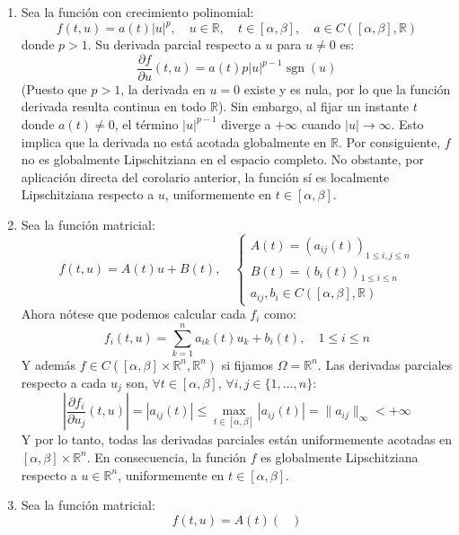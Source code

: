 {\begin{enumerate}
        \item Sea la función con crecimiento polinomial:
        \[
            f(t,u) = a(t) |u|^p, \quad u \in \mathbb{R}, \quad t \in [\alpha, \beta], \quad a \in C([\alpha, \beta], \mathbb{R})
        \]
        donde $p > 1$. Su derivada parcial respecto a $u$ para $u \neq 0$ es:
        \[
            \frac{\partial f}{\partial u}(t,u) = a(t) p |u|^{p-1} \operatorname{sgn}(u)
        \]
        (Puesto que $p > 1$, la derivada en $u=0$ existe y es nula, por lo que la función derivada resulta continua en todo $\mathbb{R}$). Sin embargo, al fijar un instante $t$ donde $a(t) \neq 0$, el término $|u|^{p-1}$ diverge a $+\infty$ cuando $|u| \to \infty$. Esto implica que la derivada no está acotada globalmente en $\mathbb{R}$. Por consiguiente, $f$ no es globalmente Lipschitziana en el espacio completo. No obstante, por aplicación directa del corolario anterior, la función sí es localmente Lipschitziana respecto a $u$, uniformemente en $t \in [\alpha, \beta]$.
        \item Sea la función matricial:
        \[
            f(t,u) = A(t) u + B(t), \quad
            \begin{cases}
                A(t) = (a_{ij}(t))_{1 \leq i,j \leq n} \\
                B(t) = (b_i(t))_{1 \leq i \leq n} \\
                a_{ij}, b_i \in C([\alpha, \beta], \mathbb{R})
            \end{cases}
        \]
        Ahora nótese que podemos calcular cada $f_i$ como:
        \[
            f_i(t,u) = \sum_{k=1}^n a_{ik}(t) u_k + b_i(t), \quad 1 \leq i \leq n
        \]
        Y además $f \in C([\alpha, \beta] \times \mathbb{R}^n, \mathbb{R}^n)$ si fijamos $\Omega = \mathbb{R}^n$. Las derivadas parciales respecto a cada $u_j$ son, $\forall t \in [\alpha, \beta]$, $\forall i,j \in \{1, \ldots, n\}$:
        \[
            \left| \frac{\partial f_i}{\partial u_j}(t,u) \right| = 
            |a_{ij}(t)| \leq 
            \max_{t \in [\alpha, \beta]} |a_{ij}(t)| = 
            \| a_{ij} \|_\infty < +\infty
        \]
        Y por lo tanto, todas las derivadas parciales están uniformemente acotadas en $[\alpha, \beta] \times \mathbb{R}^n$. En consecuencia, la función $f$ es globalmente Lipschitziana respecto a $u \in \mathbb{R}^n$, uniformemente en $t \in [\alpha, \beta]$.
        \item Sea la función matricial:
        \[
            f(t,u) = A(t) 
            \begin{pmatrix}

\end{pmatrix}\]
\end{enumerate}}
